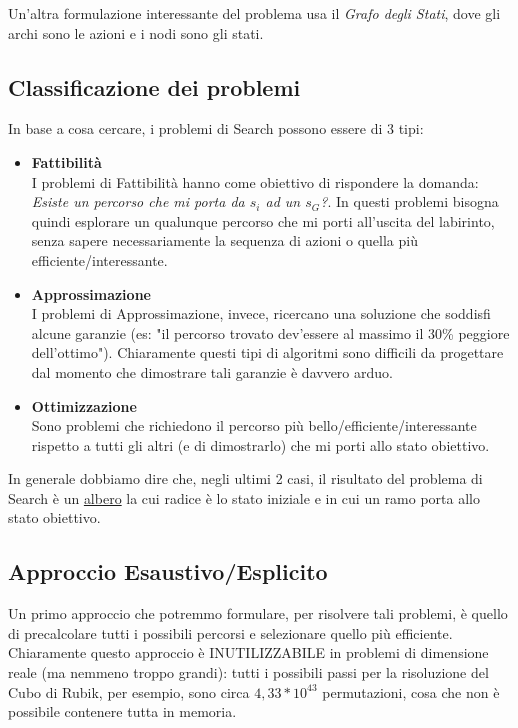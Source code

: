 Un'altra formulazione interessante del problema usa il \textit{Grafo degli Stati}, dove gli archi sono le azioni e i nodi sono gli
stati.

\subsection{Classificazione dei problemi}
In base a cosa cercare, i problemi di Search possono essere di 3 tipi:
\begin{itemize}
    \item \textbf{Fattibilità} \label{def:fattibilità} \\ 
    I problemi di Fattibilità hanno come obiettivo di rispondere la domanda: \textit{Esiste un percorso che mi porta da $s_i$ ad un $s_G$?}.
    In questi problemi bisogna quindi esplorare un qualunque percorso che mi porti all'uscita del labirinto, senza sapere necessariamente la sequenza di azioni o quella più efficiente/interessante.
    \item \textbf{Approssimazione}\\
    I problemi di Approssimazione, invece, ricercano una soluzione che soddisfi alcune garanzie (es: "il percorso trovato dev'essere al massimo il 30\% peggiore dell'ottimo").
    Chiaramente questi tipi di algoritmi sono difficili da progettare dal momento che dimostrare tali garanzie è davvero arduo.
    \item \textbf{Ottimizzazione}\\
    Sono problemi che richiedono il percorso più bello/efficiente/interessante rispetto a tutti gli altri (e di dimostrarlo) che mi porti allo stato obiettivo.
\end{itemize}
In generale dobbiamo dire che, negli ultimi 2 casi, il risultato del problema di Search è un \href{https://it.wikipedia.org/wiki/Albero_(informatica)}{albero} la cui radice è lo stato iniziale e in cui un ramo porta allo stato obiettivo.

\subsection{Approccio Esaustivo/Esplicito}
Un primo approccio che potremmo formulare, per risolvere tali problemi, è quello di
precalcolare tutti i possibili percorsi e selezionare quello più efficiente. Chiaramente questo approccio è INUTILIZZABILE
in problemi di dimensione reale (ma nemmeno troppo grandi): tutti i possibili passi per la risoluzione del Cubo di Rubik, per esempio, sono
circa $4,33 * 10^{43}$ permutazioni, cosa che non è possibile contenere tutta in memoria.

